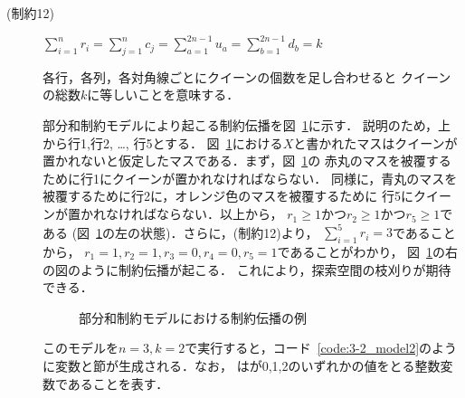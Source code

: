 \begin{description}
 \item[(制約12)] $\sum\limits_{i=1}^{n} 
r_{i} = \sum\limits_{j=1}^{n} 
c_{j} =\sum\limits_{a=1}^{2n-1} 
u_{a} =\sum\limits_{b=1}^{2n-1} 
d_{b} = k$ \par
各行，各列，各対角線ごとにクイーンの個数を足し合わせると
クイーンの総数$k$に等しいことを意味する．\par

部分和制約モデルにより起こる制約伝播を図~\ref{fig:constraint}に示す．
説明のため，上から行1,行2, \dots , 行5とする．
図~\ref{fig:constraint}における$X$と書かれたマスはクイーンが
置かれないと仮定したマスである．まず，図~\ref{fig:constraint}の
赤丸のマスを被覆するために行1にクイーンが置かれなければならない．
同様に，青丸のマスを被覆するために行2に，オレンジ色のマスを被覆するために
行5にクイーンが置かれなければならない．以上から，
$r_1 \geq 1$かつ$r_2 \geq 1$かつ$r_5 \geq 1$である
(図~\ref{fig:constraint}の左の状態)．さらに，(制約12)より，
$\sum\limits _{i=1}^{5} r_i = 3$であることから，
$r_1 = 1,r_2=1,r_3=0,r_4=0,r_5=1$であることがわかり，
図~\ref{fig:constraint}の右の図のように制約伝播が起こる．
これにより，探索空間の枝刈りが期待できる．

\begin{figure}[htb]
 \begin{minipage}[b]{0.45\linewidth}
  \centering
  
 \end{minipage}
 \begin{minipage}[b]{0.45\linewidth}
  
 \end{minipage}
 \caption{部分和制約モデルにおける制約伝播の例}
 \label{fig:constraint}
\end{figure}

このモデルを$n=3,k=2$で実行すると，コード~\ref{code:3-2_model2}のように変数と節が生成される．なお，  はが0,1,2のいずれかの値をとる整数変数であることを表す．


\end{description}